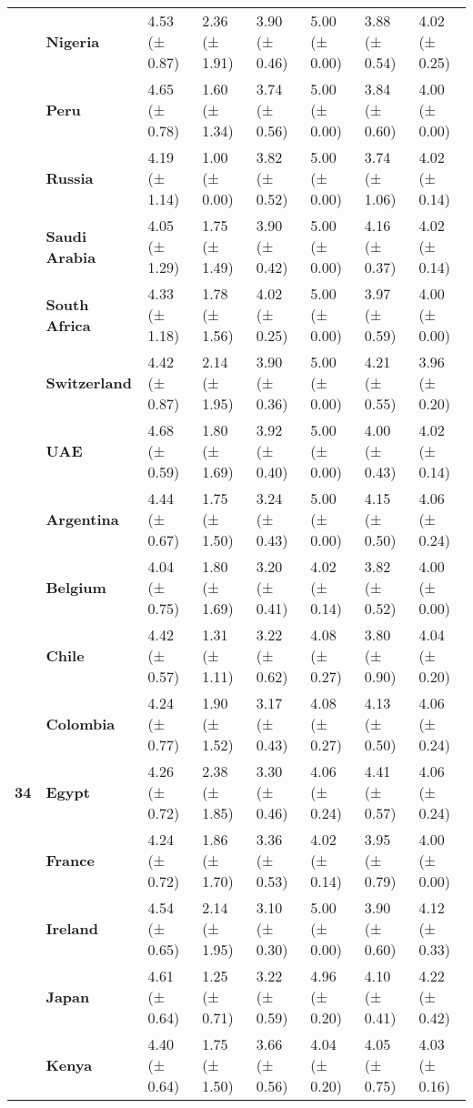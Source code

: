 \begin{longtable}{llllllll}
\textbf{} & \textbf{Nigeria} & 4.53 (± 0.87) & 2.36 (± 1.91) & 3.90 (± 0.46) & 5.00 (± 0.00) & 3.88 (± 0.54) & 4.02 (± 0.25) \\
\textbf{} & \textbf{Peru} & 4.65 (± 0.78) & 1.60 (± 1.34) & 3.74 (± 0.56) & 5.00 (± 0.00) & 3.84 (± 0.60) & 4.00 (± 0.00) \\
\textbf{} & \textbf{Russia} & 4.19 (± 1.14) & 1.00 (± 0.00) & 3.82 (± 0.52) & 5.00 (± 0.00) & 3.74 (± 1.06) & 4.02 (± 0.14) \\
\textbf{} & \textbf{Saudi Arabia} & 4.05 (± 1.29) & 1.75 (± 1.49) & 3.90 (± 0.42) & 5.00 (± 0.00) & 4.16 (± 0.37) & 4.02 (± 0.14) \\
\textbf{} & \textbf{South Africa} & 4.33 (± 1.18) & 1.78 (± 1.56) & 4.02 (± 0.25) & 5.00 (± 0.00) & 3.97 (± 0.59) & 4.00 (± 0.00) \\
\textbf{} & \textbf{Switzerland} & 4.42 (± 0.87) & 2.14 (± 1.95) & 3.90 (± 0.36) & 5.00 (± 0.00) & 4.21 (± 0.55) & 3.96 (± 0.20) \\
\textbf{} & \textbf{UAE} & 4.68 (± 0.59) & 1.80 (± 1.69) & 3.92 (± 0.40) & 5.00 (± 0.00) & 4.00 (± 0.43) & 4.02 (± 0.14) \\
\cline{1-8}
\multirow[t]{19}{*}{\textbf{34}} & \textbf{Argentina} & 4.44 (± 0.67) & 1.75 (± 1.50) & 3.24 (± 0.43) & 5.00 (± 0.00) & 4.15 (± 0.50) & 4.06 (± 0.24) \\
\textbf{} & \textbf{Belgium} & 4.04 (± 0.75) & 1.80 (± 1.69) & 3.20 (± 0.41) & 4.02 (± 0.14) & 3.82 (± 0.52) & 4.00 (± 0.00) \\
\textbf{} & \textbf{Chile} & 4.42 (± 0.57) & 1.31 (± 1.11) & 3.22 (± 0.62) & 4.08 (± 0.27) & 3.80 (± 0.90) & 4.04 (± 0.20) \\
\textbf{} & \textbf{Colombia} & 4.24 (± 0.77) & 1.90 (± 1.52) & 3.17 (± 0.43) & 4.08 (± 0.27) & 4.13 (± 0.50) & 4.06 (± 0.24) \\
\textbf{} & \textbf{Egypt} & 4.26 (± 0.72) & 2.38 (± 1.85) & 3.30 (± 0.46) & 4.06 (± 0.24) & 4.41 (± 0.57) & 4.06 (± 0.24) \\
\textbf{} & \textbf{France} & 4.24 (± 0.72) & 1.86 (± 1.70) & 3.36 (± 0.53) & 4.02 (± 0.14) & 3.95 (± 0.79) & 4.00 (± 0.00) \\
\textbf{} & \textbf{Ireland} & 4.54 (± 0.65) & 2.14 (± 1.95) & 3.10 (± 0.30) & 5.00 (± 0.00) & 3.90 (± 0.60) & 4.12 (± 0.33) \\
\textbf{} & \textbf{Japan} & 4.61 (± 0.64) & 1.25 (± 0.71) & 3.22 (± 0.59) & 4.96 (± 0.20) & 4.10 (± 0.41) & 4.22 (± 0.42) \\
\textbf{} & \textbf{Kenya} & 4.40 (± 0.64) & 1.75 (± 1.50) & 3.66 (± 0.56) & 4.04 (± 0.20) & 4.05 (± 0.75) & 4.03 (± 0.16) \\

\end{longtable}
